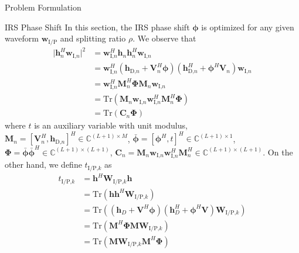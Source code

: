 \documentclass[journal]{IEEEtran}
\begin{document}
\begin{section}{Problem Formulation}
		\begin{subsection}{IRS Phase Shift}
			In this section, the IRS phase shift $\boldsymbol{\phi}$ is optimized for any given waveform $\boldsymbol{w}_{\text{I/P}}$ and splitting ratio $\rho$. We observe that
			\begin{align}
				\lvert \boldsymbol{h}_{n}^H\boldsymbol{w}_{\text{I,}n} \rvert^2
				& = \boldsymbol{w}_{\text{I,}n}^H\boldsymbol{h}_n\boldsymbol{h}_n^H\boldsymbol{w}_{\text{I,}n}\nonumber\\
				& = \boldsymbol{w}_{\text{I,}n}^H(\boldsymbol{h}_{\text{D,}n}+\boldsymbol{V}_n^H\boldsymbol{\phi})(\boldsymbol{h}_{\text{D,}n}^H+\boldsymbol{\phi}^H\boldsymbol{V}_n)\boldsymbol{w}_{\text{I,}n}\nonumber\\
				& = \boldsymbol{w}_{\text{I,}n}^H\boldsymbol{M}_n^H\boldsymbol{\Phi}\boldsymbol{M}_n\boldsymbol{w}_{\text{I,}n}\nonumber\\
				& = \mathrm{Tr}(\boldsymbol{M}_n\boldsymbol{w}_{\text{I,}n}\boldsymbol{w}_{\text{I,}n}^H\boldsymbol{M}_n^H\boldsymbol{\Phi})\nonumber\\
				& = \mathrm{Tr}(\boldsymbol{C}_n\boldsymbol{\Phi})
			\end{align}
			where $t$ is an auxiliary variable with unit modulus, $\boldsymbol{M}_n=[\boldsymbol{V}_n^H, \boldsymbol{h}_{\text{D,}n}]^H \in \mathbb{C}^{(L+1) \times M}$, $\bar{\boldsymbol{\phi}}=[\boldsymbol{\phi}^H, t]^H \in \mathbb{C}^{(L+1) \times 1}$, $\boldsymbol{\Phi}=\bar{\boldsymbol{\phi}}\bar{\boldsymbol{\phi}}^H \in \mathbb{C}^{(L+1) \times (L+1)}$, $\boldsymbol{C}_n = \boldsymbol{M}_n\boldsymbol{w}_{\text{I,}n}\boldsymbol{w}_{\text{I,}n}^H\boldsymbol{M}_n^H \in \mathbb{C}^{(L+1)\times(L+1)}$. On the other hand, we define $t_{\text{I/P,}k}$ as
			\begin{align}
				t_{\text{I/P,}k}
				& = \boldsymbol{h}^H\boldsymbol{W}_{\text{I/P,}k}\boldsymbol{h}\nonumber\\
				& = \mathrm{Tr}(\boldsymbol{h}\boldsymbol{h}^H\boldsymbol{W}_{\text{I/P,}k})\nonumber\\
				& = \mathrm{Tr}\left((\boldsymbol{h}_{D}+\boldsymbol{V}^H\boldsymbol{\phi})(\boldsymbol{h}_{D}^H+\boldsymbol{\phi}^H\boldsymbol{V})\boldsymbol{W}_{\text{I/P,}k}\right)\nonumber\\
				& = \mathrm{Tr}(\boldsymbol{M}^H\boldsymbol{\Phi}\boldsymbol{M}\boldsymbol{W}_{\text{I/P,}k})\nonumber\\
				& = \mathrm{Tr}(\boldsymbol{M}\boldsymbol{W}_{\text{I/P,}k}\boldsymbol{M}^H\boldsymbol{\Phi})\nonumber\\

\end{align}
\end{subsection}
\end{section}
\end{document}

